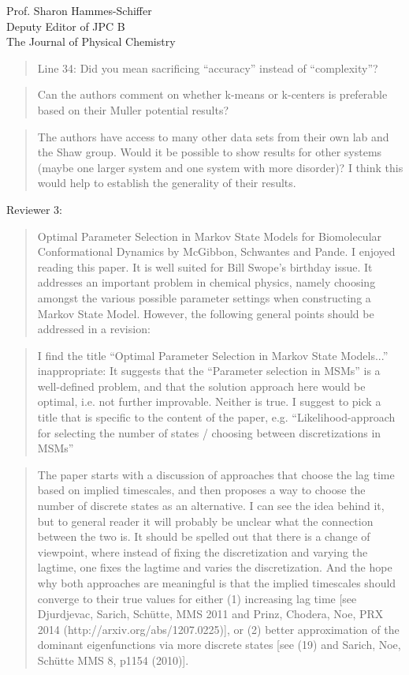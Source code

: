\documentclass{letter}
\begin{document}
\begin{letter}{Prof. Sharon Hammes-Schiffer \\ Deputy Editor of JPC B \\ The Journal of Physical Chemistry}
\begin{quote}
Line 34: Did you mean sacrificing ``accuracy'' instead of ``complexity''?
\end{quote}

\begin{quote}
Can the authors comment on whether k-means or k-centers is preferable based on their Muller potential results?
\end{quote}

\begin{quote}
The authors have access to many other data sets from their own lab and the Shaw group.  Would it be possible to show results for other systems (maybe one larger system and one system with more disorder)?  I think this would help to establish the generality of their results.
\end{quote}


Reviewer 3:

\begin{quote}
Optimal Parameter Selection in Markov State Models for Biomolecular Conformational Dynamics by McGibbon, Schwantes and Pande. I enjoyed reading this paper. It is well suited for Bill Swope's birthday issue. It addresses an important problem in chemical physics, namely choosing amongst the various possible parameter settings when constructing a Markov State Model. However, the following general points should be addressed in a revision:
\end{quote}

\begin{quote}
I find the title “Optimal Parameter Selection in Markov State Models...” inappropriate: It suggests that the ``Parameter selection in MSMs'' is a well-defined problem, and that the solution approach here would be optimal, i.e. not further improvable. Neither is true. I suggest to pick a title that is specific to the content of the paper, e.g. ``Likelihood-approach for selecting the number of states / choosing between discretizations in MSMs''
\end{quote}

\begin{quote}
The paper starts with a discussion of approaches that choose the lag time based on implied timescales, and then proposes a way to choose the number of discrete states as an alternative. I can see the idea behind it, but to general reader it will probably be unclear what the connection between the two is. It should be spelled out that there is a change of viewpoint, where instead of fixing the discretization and varying the lagtime, one fixes the lagtime and varies the discretization. And the hope why both approaches are meaningful is that the implied timescales should converge to their true values for either (1) increasing lag time [see Djurdjevac, Sarich, Schütte, MMS 2011 and Prinz, Chodera, Noe, PRX 2014 (http://arxiv.org/abs/1207.0225)], or (2) better approximation of the dominant eigenfunctions via more discrete states [see (19) and Sarich, Noe, Sch\"{u}tte MMS 8, p1154 (2010)].
\end{quote}


\end{letter}
\end{document}
